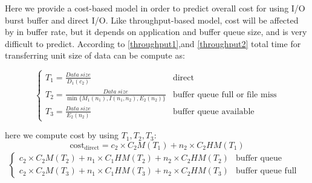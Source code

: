 Here we provide a cost-based model in order to predict overall cost for using I/O burst buffer and direct I/O.
Like throughput-based model, cost will be affected by in buffer rate, but it depends on application and buffer queue size, and is very difficult to predict.
According to \ref{throughput1},and \ref{throughput2} total time for transferring unit size of data can be compute as:

\begin{equation}
	\begin{cases}
		T_1=\frac{Data~size}{D_1(c_2)} & \text{direct}\\
		T_2=\frac{Data~size}{\min\{M_1(n_1),I(n_1,n_2),E_2(n_2)\}} &\text{buffer queue full or file miss}\\
		T_3=\frac{Data~size}{E_2(n_2)} &\text{buffer queue available}
	\end{cases}
\end{equation}

here we compute cost by using $T_1,T_2,T_3$:
\begin{equation}
	\text{cost}_\text{direct}=c_2\times C_2M(T_1)+n_2\times C_2HM(T_1)
\end{equation}
\begin{align}
	\begin{cases}
		c_2\times C_2M(T_2)+n_1\times C_1HM(T_2)+n_2\times C_2HM(T_2)&\text{buffer queue available}\\
		c_2\times C_2M(T_3)+n_1\times C_1HM(T_3)+n_2\times C_2HM(T_3) &\text{buffer queue full}
	\end{cases}
\end{align}



